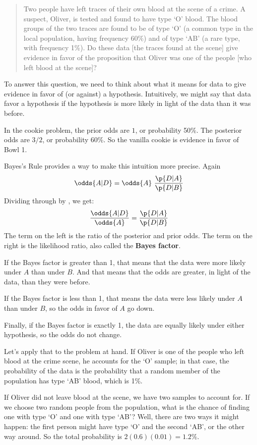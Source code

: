 \documentclass[12pt]{book}
\theoremstyle{exercise}
\begin{document}
\begin{quote}
Two people have left traces of their own blood at the scene of
a crime.  A suspect, Oliver, is tested and found to have type
`O' blood.  The blood groups of the two traces are found to
be of type `O' (a common type in the local population, having frequency
60\%) and of type `AB' (a rare type, with frequency 1\%).
Do these data [the traces found at the scene] give evidence
in favor of the proposition that Oliver was one of the people
[who left blood at the scene]?
\end{quote}

To answer this question, we need to think about what it means
for data to give evidence in favor of (or against) a hypothesis.
Intuitively, we might say that data favor a hypothesis if the
hypothesis is more likely in light of the data than it was before.


In the cookie problem, the prior odds are $1$, or probability 50\%.
The posterior odds are $3/2$, or probability 60\%.  
So the vanilla cookie is evidence in favor of Bowl 1.

Bayes's Rule provides a way to make this intuition more precise.  Again
%
\[ \odds{A|D} = \odds{A}~\frac{\p{D|A}}{\p{D|B}} \]
%
Dividing through by , we get:
%
\[ \frac{\odds{A|D}}{\odds{A}} = \frac{\p{D|A}}{\p{D|B}} \]
%
The term on the left is the ratio of the posterior and prior odds.
The term on the right is the likelihood ratio, also called the {\bf Bayes
factor}.


If the Bayes factor is greater than 1, that means that the
data were more likely under $A$ than under $B$.  
And that means that the odds are greater, in light of the data, than they were before.

If the Bayes factor is less than 1, that means the data were
less likely under $A$ than under $B$, so the odds in
favor of $A$ go down.

Finally, if the Bayes factor is exactly 1, the data are equally
likely under either hypothesis, so the odds do not change.

Let's apply that to the problem at hand.  If Oliver is
one of the people who left blood at the crime scene, he
accounts for the `O' sample; in that case, the probability of the data
is the probability that a random member of the population
has type `AB' blood, which is 1\%.

If Oliver did not leave blood at the scene, we have two
samples to account for.  If we choose two random people from
the population, what is the chance of finding one with type `O'
and one with type `AB'?  Well, there are two ways it might happen:
the first person might have type `O' and the second
`AB', or the other way around.  So the total probability is
$2 (0.6) (0.01) = 1.2\%$.
\end{document}
